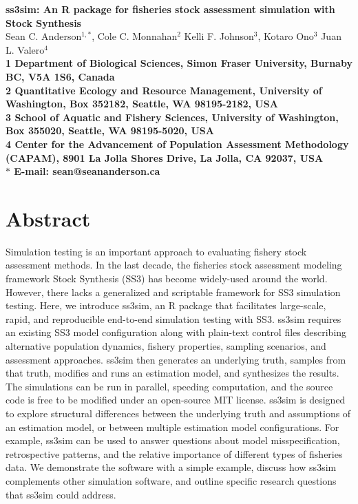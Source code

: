 \documentclass[10pt]{article}
\date{}
\begin{document}
\begin{flushleft}
{\Large
\textbf{ss3sim: An R package for fisheries stock assessment simulation with Stock Synthesis}
}
\\
Sean C. Anderson$^{1,\ast}$,
Cole C. Monnahan$^{2}$
Kelli F. Johnson$^{3}$,
Kotaro Ono$^{3}$
Juan L. Valero$^{4}$
\\
\bf{1} Department of Biological Sciences,
Simon Fraser University,
Burnaby BC, V5A 1S6, Canada
\\
\bf{2} Quantitative Ecology and Resource Management,
University of Washington, Box 352182,
Seattle, WA 98195-2182, USA
\\
\bf{3} School of Aquatic and Fishery Sciences,
University of Washington, Box 355020,
Seattle, WA 98195-5020, USA
\\
\bf{4} Center for the Advancement of Population Assessment Methodology
(CAPAM), 8901 La Jolla Shores Drive, La Jolla, CA 92037, USA
\\
$\ast$ E-mail: sean@seananderson.ca
\end{flushleft}


\linenumbers
\modulolinenumbers[2]

\section*{Abstract}

Simulation testing is an important approach to evaluating fishery stock assessment methods. In the last decade, the fisheries stock assessment modeling framework Stock Synthesis (SS3) has become widely-used around the world. However, there lacks a generalized and scriptable framework for SS3 simulation testing. Here, we introduce ss3sim, an R package that facilitates large-scale, rapid, and reproducible end-to-end simulation testing with SS3. ss3sim requires an existing SS3 model configuration along with plain-text control files describing alternative population dynamics, fishery properties, sampling scenarios, and assessment approaches. ss3sim then generates an underlying truth, samples from that truth, modifies and runs an estimation model, and synthesizes the results. The simulations can be run in parallel, speeding computation, and the source code is free to be modified under an open-source MIT license. ss3sim is designed to explore structural differences between the underlying truth and assumptions of an estimation model, or between multiple estimation model configurations. For example, ss3sim can be used to answer questions about model misspecification, retrospective patterns, and the relative importance of different types of fisheries data. We demonstrate the software with a simple example, discuss how ss3sim complements other simulation software, and outline specific research questions that ss3sim could address.
\end{document}
